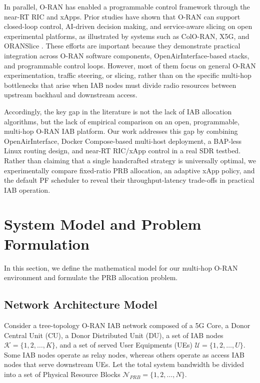 \documentclass[conference, a4paper]{IEEEtran}
\begin{document}
In parallel, O-RAN has enabled a programmable control framework through the near-RT RIC and xApps. Prior studies have shown that O-RAN can support closed-loop control, AI-driven decision making, and service-aware slicing on open experimental platforms, as illustrated by systems such as ColO-RAN, X5G, and ORANSlice \cite{polese2023coloran,villa2024x5g,cheng2024oranslice}. These efforts are important because they demonstrate practical integration across O-RAN software components, OpenAirInterface-based stacks, and programmable control loops. However, most of them focus on general O-RAN experimentation, traffic steering, or slicing, rather than on the specific multi-hop bottlenecks that arise when IAB nodes must divide radio resources between upstream backhaul and downstream access.

Accordingly, the key gap in the literature is not the lack of IAB allocation algorithms, but the lack of empirical comparison on an open, programmable, multi-hop O-RAN IAB platform. Our work addresses this gap by combining OpenAirInterface, Docker Compose-based multi-host deployment, a BAP-less Linux routing design, and near-RT RIC/xApp control in a real SDR testbed. Rather than claiming that a single handcrafted strategy is universally optimal, we experimentally compare fixed-ratio PRB allocation, an adaptive xApp policy, and the default PF scheduler to reveal their throughput-latency trade-offs in practical IAB operation.

\section{System Model and Problem Formulation}
In this section, we define the mathematical model for our multi-hop O-RAN environment and formulate the PRB allocation problem.

\subsection{Network Architecture Model}
Consider a tree-topology O-RAN IAB network composed of a 5G Core, a Donor Central Unit (CU), a Donor Distributed Unit (DU), a set of IAB nodes $\mathcal{K} = \{1,2,\ldots,K\}$, and a set of served User Equipments (UEs) $\mathcal{U} = \{1,2,\ldots,U\}$. Some IAB nodes operate as relay nodes, whereas others operate as access IAB nodes that serve downstream UEs. Let the total system bandwidth be divided into a set of Physical Resource Blocks $\mathcal{N}_{PRB} = \{1,2,\ldots,N\}$.
\end{document}
